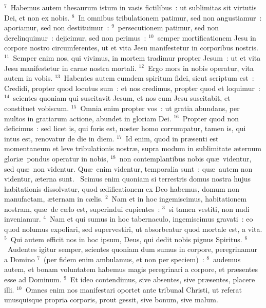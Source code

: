 ${}^{7}$~Habemus autem thesaurum istum in vasis fictilibus~: ut sublimitas sit virtutis Dei, et non ex nobis.
${}^{8}$~In omnibus tribulationem patimur, sed non angustiamur~: aporiamur, sed non destituimur~:
${}^{9}$~persecutionem patimur, sed non derelinquimur~: dejicimur, sed non perimus~:
${}^{10}$~semper mortificationem Jesu in corpore nostro circumferentes, ut et vita Jesu manifestetur in corporibus nostris.
${}^{11}$~Semper enim nos, qui vivimus, in mortem tradimur propter Jesum~: ut et vita Jesu manifestetur in carne nostra mortali.
${}^{12}$~Ergo mors in nobis operatur, vita autem in vobis.
${}^{13}$~Habentes autem eumdem spiritum fidei, sicut scriptum est~: Credidi, propter quod locutus sum~: et nos credimus, propter quod et loquimur~:
${}^{14}$~scientes quoniam qui suscitavit Jesum, et nos cum Jesu suscitabit, et constituet vobiscum.
${}^{15}$~Omnia enim propter vos~: ut gratia abundans, per multos in gratiarum actione, abundet in gloriam Dei.
${}^{16}$~Propter quod non deficimus~: sed licet is, qui foris est, noster homo corrumpatur, tamen is, qui intus est, renovatur de die in diem.
${}^{17}$~Id enim, quod in pr\ae senti est momentaneum et leve tribulationis nostr\ae , supra modum in sublimitate \ae ternum glori\ae\ pondus operatur in nobis,
${}^{18}$~non contemplantibus nobis qu\ae\ videntur, sed qu\ae\ non videntur. Qu\ae\ enim videntur, temporalia sunt~: qu\ae\ autem non videntur, \ae terna sunt.
~\lettrine[lines=10,image=true,loversize=0.05,lraise=-0.03]{S}{}cimus enim quoniam si terrestris domus nostra hujus habitationis dissolvatur, quod \ae dificationem ex Deo habemus, domum non manufactam, \ae ternam in c\ae lis.
${}^{2}$~Nam et in hoc ingemiscimus, habitationem nostram, qu\ae\ de c\ae lo est, superindui cupientes~:
${}^{3}$~si tamen vestiti, non nudi inveniamur.
${}^{4}$~Nam et qui sumus in hoc tabernaculo, ingemiscimus gravati~: eo quod nolumus expoliari, sed supervestiri, ut absorbeatur quod mortale est, a vita.
${}^{5}$~Qui autem efficit nos in hoc ipsum, Deus, qui dedit nobis pignus Spiritus.
${}^{6}$~Audentes igitur semper, scientes quoniam dum sumus in corpore, peregrinamur a Domino
${}^{7}$~(per fidem enim ambulamus, et non per speciem)~:
${}^{8}$~audemus autem, et bonam voluntatem habemus magis peregrinari a corpore, et pr\ae sentes esse ad Dominum.
${}^{9}$~Et ideo contendimus, sive absentes, sive pr\ae sentes, placere illi.
${}^{10}$~Omnes enim nos manifestari oportet ante tribunal Christi, ut referat unusquisque propria corporis, prout gessit, sive bonum, sive malum.


